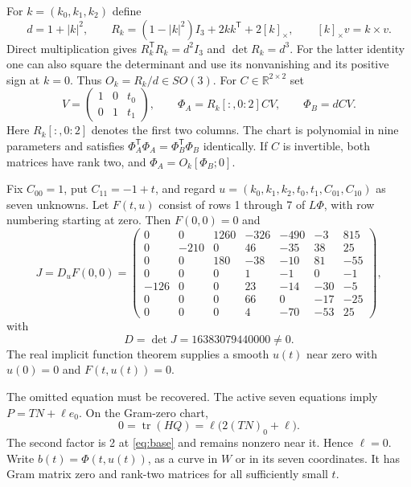 \documentclass[11pt]{article}
\newcommand{\R}{\mathbb R}
\newcommand{\tr}{\operatorname{tr}}
\newcommand{\transpose}{^{\mathsf T}}
\begin{document}
For $k=(k_0,k_1,k_2)$ define
\[
 d=1+|k|^2,\qquad
 R_k=(1-|k|^2)I_3+2kk\transpose+2[k]_\times,
 \qquad [k]_\times v=k\times v.
\]
Direct multiplication gives $R_k\transpose R_k=d^2I_3$ and
$\det R_k=d^3$. For the latter identity one can also square the
determinant and use its nonvanishing and its positive sign at $k=0$.
Thus $O_k=R_k/d\in SO(3)$. For $C\in\R^{2\times2}$ set
\begin{equation}\label{eq:chart}
 V=\begin{pmatrix}1&0&t_0\\0&1&t_1\end{pmatrix},\qquad
 \Phi_A=R_k[:,0\!:\!2]CV,\qquad \Phi_B=dCV.
\end{equation}
Here $R_k[:,0\!:\!2]$ denotes the first two columns. The chart is
polynomial in nine parameters and satisfies
$\Phi_A\transpose\Phi_A=\Phi_B\transpose\Phi_B$ identically.
If $C$ is invertible, both matrices have rank two, and
$\Phi_A=O_k[\Phi_B;0]$.

Fix $C_{00}=1$, put $C_{11}=-1+t$, and regard
$u=(k_0,k_1,k_2,t_0,t_1,C_{01},C_{10})$ as seven unknowns.
Let $F(t,u)$ consist of rows 1 through 7 of $L\Phi$, with row numbering
starting at zero. Then $F(0,0)=0$ and
\begin{equation}\label{eq:J}
 J=D_uF(0,0)=\begin{pmatrix}
0&0&1260&-326&-490&-3&815\\
0&-210&0&46&-35&38&25\\
0&0&180&-38&-10&81&-55\\
0&0&0&1&-1&0&-1\\
-126&0&0&23&-14&-30&-5\\
0&0&0&66&0&-17&-25\\
0&0&0&4&-70&-53&25
\end{pmatrix},
\end{equation}
with
\begin{equation}\label{eq:D}
 D=\det J=16383079440000\ne0.
\end{equation}
The real implicit function theorem supplies a smooth $u(t)$ near zero
with $u(0)=0$ and $F(t,u(t))=0$.

The omitted equation must be recovered. The active seven equations imply
$P=TN+\ell e_0$. On the Gram-zero chart,
\begin{equation}\label{eq:omitted}
 0=\tr(HQ)=\ell\bigl(2(TN)_0+\ell\bigr).
\end{equation}
The second factor is 2 at \eqref{eq:base} and remains nonzero near it.
Hence $\ell=0$. Write $b(t)=\Phi(t,u(t))$, as a curve in $W$ or in its
seven coordinates. It has Gram matrix zero and rank-two matrices for
all sufficiently small $t$.
\end{document}
